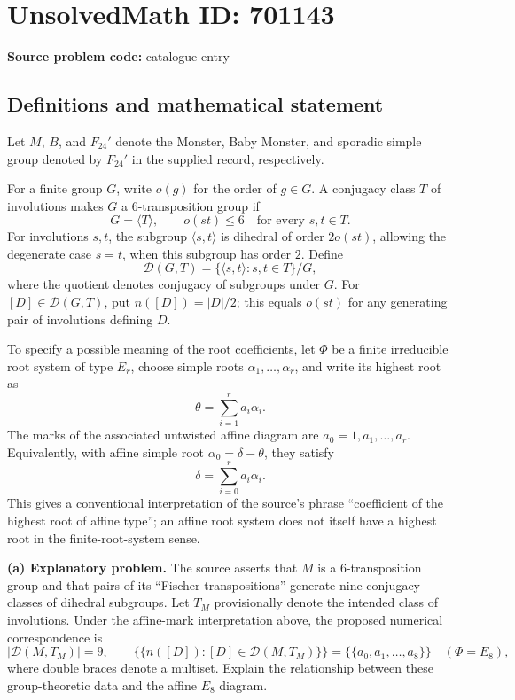 \documentclass[11pt]{article}
\begin{document}
\section*{UnsolvedMath ID: 701143}
\textbf{Source problem code:} catalogue entry
\subsection{Definitions and mathematical statement}
Let \(M\), \(B\), and \(F_{24}'\) denote the Monster, Baby Monster, and sporadic simple group denoted by \(F_{24}'\) in the supplied record, respectively.

For a finite group \(G\), write \(o(g)\) for the order of \(g\in G\). A conjugacy class \(T\) of involutions makes \(G\) a \(6\)-transposition group if
\[
G=\langle T\rangle,\qquad o(st)\leq 6\quad\text{for every }s,t\in T.
\]
For involutions \(s,t\), the subgroup \(\langle s,t\rangle\) is dihedral of order \(2o(st)\), allowing the degenerate case \(s=t\), when this subgroup has order \(2\). Define
\[
\mathcal D(G,T)=\{\langle s,t\rangle:s,t\in T\}/G,
\]
where the quotient denotes conjugacy of subgroups under \(G\). For \([D]\in\mathcal D(G,T)\), put \(n([D])=|D|/2\); this equals \(o(st)\) for any generating pair of involutions defining \(D\).

To specify a possible meaning of the root coefficients, let \(\Phi\) be a finite irreducible root system of type \(E_r\), choose simple roots \(\alpha_1,\ldots,\alpha_r\), and write its highest root as
\[
\theta=\sum_{i=1}^{r}a_i\alpha_i.
\]
The marks of the associated untwisted affine diagram are \(a_0=1,a_1,\ldots,a_r\). Equivalently, with affine simple root \(\alpha_0=\delta-\theta\), they satisfy
\[
\delta=\sum_{i=0}^{r}a_i\alpha_i.
\]
This gives a conventional interpretation of the source's phrase ``coefficient of the highest root of affine type''; an affine root system does not itself have a highest root in the finite-root-system sense.

\textbf{(a) Explanatory problem.} The source asserts that \(M\) is a \(6\)-transposition group and that pairs of its ``Fischer transpositions'' generate nine conjugacy classes of dihedral subgroups. Let \(T_M\) provisionally denote the intended class of involutions. Under the affine-mark interpretation above, the proposed numerical correspondence is
\[
|\mathcal D(M,T_M)|=9,
\qquad
\bigl\{\!\bigl\{n([D]):[D]\in\mathcal D(M,T_M)\bigr\}\!\bigr\}
=
\bigl\{\!\bigl\{a_0,a_1,\ldots,a_8\bigr\}\!\bigr\}
\quad(\Phi=E_8),
\]
where double braces denote a multiset. Explain the relationship between these group-theoretic data and the affine \(E_8\) diagram.
\end{document}
